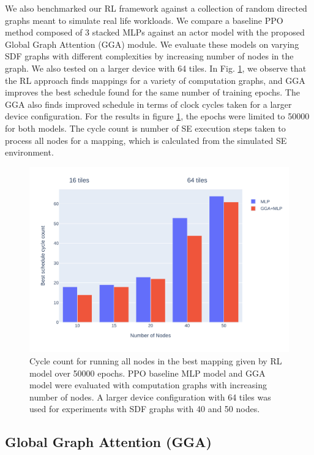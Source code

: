 We also benchmarked our RL framework against a collection of random directed graphs meant to simulate real life workloads. 
We compare a baseline PPO method composed of 3 stacked MLPs against an actor model with the proposed Global Graph Attention (GGA) module.
We evaluate these models on varying SDF graphs with different complexities by increasing number of nodes in the graph. 
We also tested on a larger device with 64 tiles.
In Fig. \ref{fig:nodes_graph}, we observe that the RL approach finds mappings for a variety of computation graphs, and GGA
improves the best schedule found for the same number of training epochs. The GGA also finds improved schedule in terms of clock cycles taken for a larger device configuration. 
For the results in figure \ref{fig:nodes_graph}, the epochs were limited to 50000 for both models. 
The cycle count is number of SE execution steps taken to process all nodes for a mapping, which is calculated from the simulated SE environment. 

\begin{figure}[h]
  \centering
  \includegraphics[width=\linewidth]{fig/nodes_graph.pdf}
  \caption{Cycle count for running all nodes in the best mapping given by RL model over 50000 epochs. 
  PPO baseline MLP model and GGA model were evaluated with computation graphs with increasing number of nodes. 
  A larger device configuration with 64 tiles was used for experiments with SDF graphs with 40 and 50 nodes. }
  \label{fig:nodes_graph}
\end{figure}


\subsection{Global Graph Attention (GGA)} \label{sec:GGA_result}

